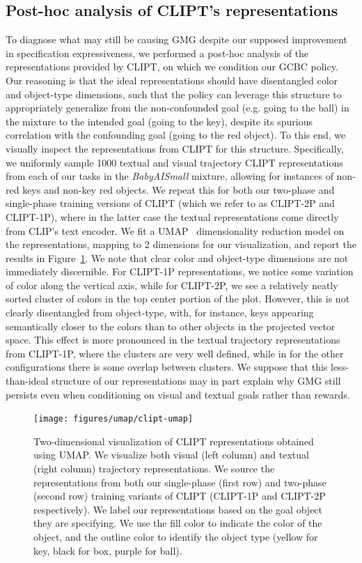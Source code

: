 \documentclass[../main.tex]{subfiles}
\begin{document}
\subsection{Post-hoc analysis of CLIPT's representations}

To diagnose what may still be causing GMG despite our supposed improvement in specification
expressiveness, we performed a post-hoc analysis of the representations provided by CLIPT, on which
we condition our GCBC policy. Our reasoning is that the ideal representations should have
disentangled color and object-type dimensions, such that the policy can leverage this structure to
appropriately generalize from the non-confounded goal (e.g. going to the ball) in the mixture to the
intended goal (going to the key), despite its spurious correlation with the confounding goal (going
to the red object). To this end, we visually inspect the representations from CLIPT for this
structure. Specifically, we uniformly sample 1000 textual and visual trajectory CLIPT
representations from each of our tasks in the \textit{BabyAISmall} mixture, allowing for instances
of non-red keys and non-key red objects. We repeat this for both our two-phase and single-phase
training versions of CLIPT (which we refer to as CLIPT-2P and CLIPT-1P), where in the latter case
the textual representations come directly from CLIP's text encoder. We fit
a UMAP~\citep{mcinnes_umap_2018} dimensionality reduction model on the representations, mapping to
2 dimensions for our visualization, and report the results in Figure~\ref{fig:clipt-umap}. We note
	that clear color and object-type dimensions are not immediately discernible. For CLIPT-1P
	representations, we notice some variation of color along the vertical axis, while for CLIPT-2P, we
	see a relatively neatly sorted cluster of colors in the top center portion of the plot. However,
	this is not clearly disentangled from object-type, with, for instance, keys appearing semantically
	closer to the colors than to other objects in the projected vector space. This effect is more
	pronounced in the textual trajectory representations from CLIPT-1P, where the clusters are very
	well defined, while in for the other configurations there is some overlap between clusters. We
	suppose that this less-than-ideal structure of our representations may in part explain why GMG
	still persists even when conditioning on visual and textual goals rather than rewards.

\begin{figure}[t]
	\centering
	\texttt{[image: figures/umap/clipt-umap]}
	\caption[Visualization of CLIPT representations with UMAP]{Two-dimensional visualization of CLIPT
		representations obtained using UMAP. We visualize both visual (left column) and textual (right
		column) trajectory representations. We source the representations from both our single-phase
		(first row) and two-phase (second row) training variants of CLIPT (CLIPT-1P and CLIPT-2P
		respectively). We label our representations based on the goal object they are specifying. We use
		the fill color to indicate the color of the object, and the outline color to identify the object
		type (yellow for key, black for box, purple for ball).}
	\label{fig:clipt-umap}
\end{figure}
\end{document}
